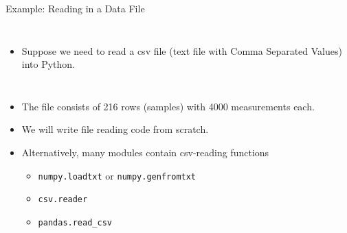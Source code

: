 \documentclass[10pt, aspectratio=169]{beamer} %
\begin{document}
\begin{frame}[fragile]
 {Example: Reading in a Data File}
\begin{columns}
\begin{itemize}
\item Suppose we need to read a csv file (text file with Comma Separated Values) into Python.
\end{itemize}
\end{columns}
\begin{itemize}
\item The file consists of 216 rows (samples) with 4000 measurements each.
\item We will write file reading code from scratch.
\item Alternatively, many modules contain csv-reading functions
\begin{itemize}
\item \verb+numpy.loadtxt+ or \verb+numpy.genfromtxt+
\item \verb+csv.reader+
\item \verb+pandas.read_csv+
\end{itemize}
\end{itemize}
\end{frame}
\end{document}
